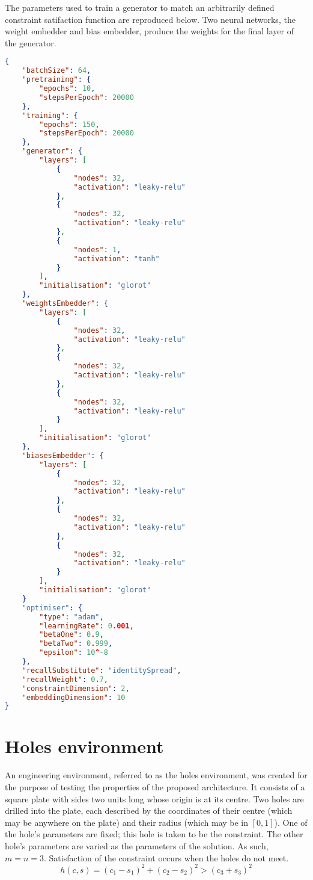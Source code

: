 \documentclass[../main.tex]{subfiles}
\begin{document}
The parameters used to train a generator to match an arbitrarily defined constraint satifaction function are reproduced below.
Two neural networks, the weight embedder and bias embedder, produce the weights for the final layer of the generator.

\begin{lstlisting}[language=json,firstnumber=1,caption={Experimental parameters for training a generator to match an arbitrary constraint satisfaction function parameterised by a constraint vector.},captionpos=b]
{
    "batchSize": 64,
    "pretraining": {
        "epochs": 10,
        "stepsPerEpoch": 20000
    },
    "training": {
        "epochs": 150,
        "stepsPerEpoch": 20000
    },
    "generator": {
        "layers": [
            {
                "nodes": 32,
                "activation": "leaky-relu"
            },
            {
                "nodes": 32,
                "activation": "leaky-relu"
            },
            {
                "nodes": 1,
                "activation": "tanh"
            }
        ],
        "initialisation": "glorot"
    },
    "weightsEmbedder": {
        "layers": [
            {
                "nodes": 32,
                "activation": "leaky-relu"
            },
            {
                "nodes": 32,
                "activation": "leaky-relu"
            },
            {
                "nodes": 32,
                "activation": "leaky-relu"
            }
        ],
        "initialisation": "glorot"
    },
    "biasesEmbedder": {
        "layers": [
            {
                "nodes": 32,
                "activation": "leaky-relu"
            },
            {
                "nodes": 32,
                "activation": "leaky-relu"
            },
            {
                "nodes": 32,
                "activation": "leaky-relu"
            }
        ],
        "initialisation": "glorot"
    }
    "optimiser": {
        "type": "adam",
        "learningRate": 0.001,
        "betaOne": 0.9,
        "betaTwo": 0.999,
        "epsilon": 10^-8
    },
    "recallSubstitute": "identitySpread",
    "recallWeight": 0.7,
    "constraintDimension": 2,
    "embeddingDimension": 10
}
\end{lstlisting}

\section{Holes environment} \label{appendix:holesEnvironment}

An engineering environment, referred to as the holes environment, was created for the purpose of testing the properties of the proposed architecture.
It consists of a square plate with sides two units long whose origin is at its centre.
Two holes are drilled into the plate, each described by the coordinates of their centre (which may be anywhere on the plate) and their radius (which may be in $[0,1]$).
One of the hole's parameters are fixed; this hole is taken to be the constraint.
The other hole's parameters are varied as the parameters of the solution.
As such, $m=n=3$.
Satisfaction of the constraint occurs when the holes do not meet.
\begin{equation}
    h(c,s)=(c_1-s_1)^2+(c_2-s_2)^2>(c_3+s_3)^2
\end{equation}
\end{document}
